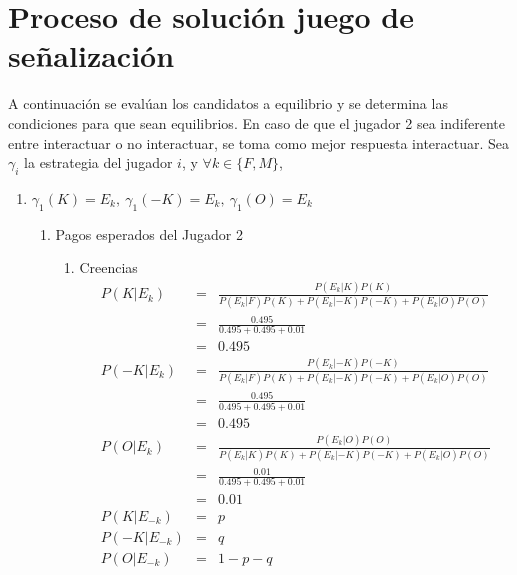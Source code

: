 \section{Proceso de solución juego de señalización}
A continuación se evalúan los candidatos a equilibrio y se determina las condiciones para que sean equilibrios.  En caso de que el jugador 2 sea indiferente entre interactuar o no interactuar, se toma como mejor respuesta interactuar. Sea $\gamma_i$ la estrategia del jugador $i$, y $\forall k \in \{F,M\} $,
\small{
\begin{enumerate}
    \item $\gamma_1(K)=E_k, \ \gamma_1(-K)=E_k, \ \gamma_1(O)=E_k$ %
    \begin{enumerate}
        \item Pagos esperados del Jugador 2
        \begin{enumerate}
            \item Creencias
                \begin{eqnarray*}
                    P(K|E_k)&=&\frac{P(E_k|K)P(K)}{P(E_k|F)P(K)+P(E_k|-K)P(-K)+P(E_k|O)P(O)}\\
                            &=&\frac{0.495}{0.495+0.495+0.01}\\
                            &=&0.495\\
                    P(-K|E_k)&=&\frac{P(E_k|-K)P(-K)}{P(E_k|F)P(K)+P(E_k|-K)P(-K)+P(E_k|O)P(O)}\\
                             &=&\frac{0.495}{0.495+0.495+0.01}\\
                             &=&0.495\\
                    P(O|E_k)&=&\frac{P(E_k|O)P(O)}{P(E_k|K)P(K)+P(E_k|-K)P(-K)+P(E_k|O)P(O)}\\
                            &=&\frac{0.01}{0.495+0.495+0.01}\\
                            &=&0.01\\
                    P(K|E_{-k})&=&p\\
                    P(-K|E_{-k})&=&q\\
                    P(O|E_{-k})&=&1-p-q\\
                \end{eqnarray*}


\end{enumerate}
\end{enumerate}
\end{enumerate}}
